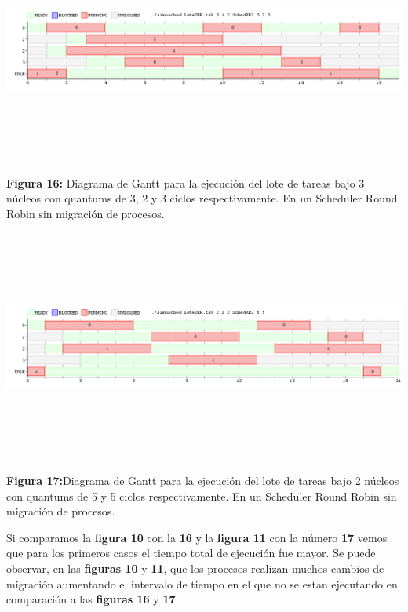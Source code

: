 \documentclass[a4paper]{article}
\begin{document}
\includegraphics[width=\textwidth,height=3.0in,keepaspectratio
]{imagenes/ej8/2eje4.png} \\
\begin {flushleft}
\textbf{Figura 16:} Diagrama de Gantt para la ejecuci\'on del lote de tareas bajo 3 n\'ucleos con quantums de 3, 2 y 3 ciclos respectivamente. En un Scheduler Round Robin sin migración de procesos.
\end{flushleft}	
	

\includegraphics[width=\textwidth,height=3.0in,keepaspectratio
]{imagenes/ej8/2eje6.png} \\
\begin {flushleft}
\textbf{Figura 17:}Diagrama de Gantt para la ejecuci\'on del lote de tareas bajo 2 n\'ucleos con quantums de 5 y 5 ciclos respectivamente. En un Scheduler Round Robin sin migración de procesos.
\end{flushleft}	
 
 \bigskip
 Si comparamos la\textbf{ figura 10} con la \textbf{16} y la\textbf{ figura 11} con la número \textbf{17} vemos que para los primeros casos el tiempo total de ejecución fue mayor. Se puede observar, en las \textbf{figuras 10} y \textbf{11}, que los procesos realizan muchos cambios de migración aumentando el intervalo de tiempo en el que no se estan ejecutando en comparación a las \textbf{figuras 16} y \textbf{17}. \\
 
\end{document}

